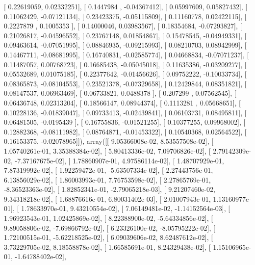 \documentclass{article}
\begin{document}
       [ 0.22619059,  0.02332251],
       [ 0.1447984 , -0.04367412],
       [ 0.05997609,  0.05827432],
       [ 0.11062429, -0.07121134],
       [ 0.23423375, -0.05115809],
       [ 0.11160778,  0.02422115],
       [ 0.2227879 ,  0.1005353 ],
       [ 0.14000046,  0.03983567],
       [ 0.18354684, -0.07293827],
       [ 0.21026817, -0.04596552],
       [ 0.23767148,  0.01854867],
       [ 0.15478545, -0.04949331],
       [ 0.09463614, -0.07051995],
       [ 0.08846935, -0.09215993],
       [ 0.08210703,  0.08942999],
       [ 0.14467711, -0.08681995],
       [ 0.16740831, -0.02585774],
       [ 0.04668834, -0.07071237],
       [ 0.11487057,  0.00768723],
       [ 0.16685438, -0.05045018],
       [ 0.11635386, -0.03209277],
       [ 0.05532689,  0.01075185],
       [ 0.22377642, -0.01456626],
       [ 0.09752222, -0.10033734],
       [ 0.08365873, -0.08104553],
       [ 0.23521378, -0.07329658],
       [ 0.12429844,  0.08351821],
       [ 0.08147537,  0.06963469],
       [ 0.06733821,  0.0488378 ],
       [ 0.207299  ,  0.07562545],
       [ 0.06436748,  0.02313204],
       [ 0.18566147,  0.08944374],
       [ 0.1113281 ,  0.05668651],
       [ 0.10228136, -0.01839047],
       [ 0.09733413, -0.02439841],
       [ 0.06103731,  0.08495811],
       [ 0.06481505, -0.0195439 ],
       [ 0.16755836, -0.01521255],
       [ 0.10377255,  0.09968002],
       [ 0.12882368, -0.08111982],
       [ 0.08764871, -0.01453322],
       [ 0.10540368,  0.02564522],
       [ 0.16153375, -0.02078965]]), array([[  9.05366008e-02,   8.53557508e-02],
       [  1.05740261e-01,   3.35388384e-02],
       [  5.80413336e-02,   7.09706826e-02],
       [  2.79142309e-02,  -7.37167675e-02],
       [  1.78860907e-01,   4.97586114e-02],
       [  1.48707929e-01,   7.87319992e-02],
       [  1.92259472e-01,  -5.63507334e-02],
       [  2.27443756e-01,   6.13856029e-02],
       [  1.86003993e-01,   7.76753598e-02],
       [  2.27865769e-01,  -8.36523363e-02],
       [  1.82852341e-01,  -2.79065218e-03],
       [  9.21207460e-02,   9.34318218e-02],
       [  1.68876616e-01,   6.80031402e-03],
       [  2.01007943e-01,   1.13160977e-01],
       [  1.78633970e-01,   9.43210554e-02],
       [  7.06149481e-02,  -1.14152564e-03],
       [  1.96923543e-01,   1.02425869e-02],
       [  8.22388900e-02,  -5.64334856e-02],
       [  9.89058806e-02,  -7.69866792e-02],
       [  6.23326100e-02,  -8.05795222e-02],
       [  1.72100515e-01,  -5.62218525e-02],
       [  6.09039606e-02,   8.62487612e-02],
       [  3.73229705e-02,   8.18558878e-02],
       [  1.66585691e-01,   8.24329438e-02],
       [  1.15106965e-01,  -1.64788402e-02],
\end{document}

